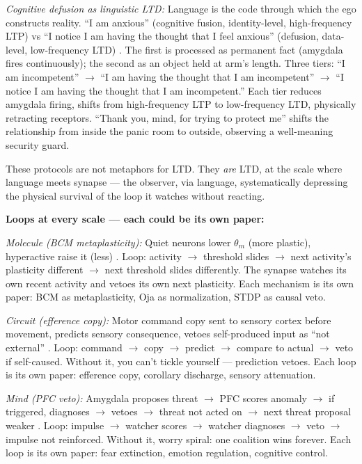 \documentclass[11pt]{article}
\begin{document}
\textit{Cognitive defusion as linguistic LTD:} Language is the code through which the ego constructs reality. ``I am anxious'' (cognitive fusion, identity-level, high-frequency LTP) vs ``I notice I am having the thought that I feel anxious'' (defusion, data-level, low-frequency LTD) \citep{nisbett1977}. The first is processed as permanent fact (amygdala fires continuously); the second as an object held at arm's length. Three tiers: ``I am incompetent'' $\to$ ``I am having the thought that I am incompetent'' $\to$ ``I notice I am having the thought that I am incompetent.'' Each tier reduces amygdala firing, shifts from high-frequency LTP to low-frequency LTD, physically retracting receptors. ``Thank you, mind, for trying to protect me'' shifts the relationship from inside the panic room to outside, observing a well-meaning security guard.

These protocols are not metaphors for LTD. They \emph{are} LTD, at the scale where language meets synapse --- the observer, via language, systematically depressing the physical survival of the loop it watches without reacting.

\textbf{Loops at every scale --- each could be its own paper:}

\textit{Molecule (BCM metaplasticity):} Quiet neurons lower $\theta_m$ (more plastic), hyperactive raise it (less) \citep{tononi2014}. Loop: activity $\to$ threshold slides $\to$ next activity's plasticity different $\to$ next threshold slides differently. The synapse watches its own recent activity and vetoes its own next plasticity. Each mechanism is its own paper: BCM as metaplasticity, Oja as normalization, STDP as causal veto.

\textit{Circuit (efference copy):} Motor command copy sent to sensory cortex before movement, predicts sensory consequence, vetoes self-produced input as ``not external'' \citep{seth2021}. Loop: command $\to$ copy $\to$ predict $\to$ compare to actual $\to$ veto if self-caused. Without it, you can't tickle yourself --- prediction vetoes. Each loop is its own paper: efference copy, corollary discharge, sensory attenuation.

\textit{Mind (PFC veto):} Amygdala proposes threat $\to$ PFC scores anomaly $\to$ if triggered, diagnoses $\to$ vetoes $\to$ threat not acted on $\to$ next threat proposal weaker \citep{seth2021,macar2026}. Loop: impulse $\to$ watcher scores $\to$ watcher diagnoses $\to$ veto $\to$ impulse not reinforced. Without it, worry spiral: one coalition wins forever. Each loop is its own paper: fear extinction, emotion regulation, cognitive control.
\end{document}

